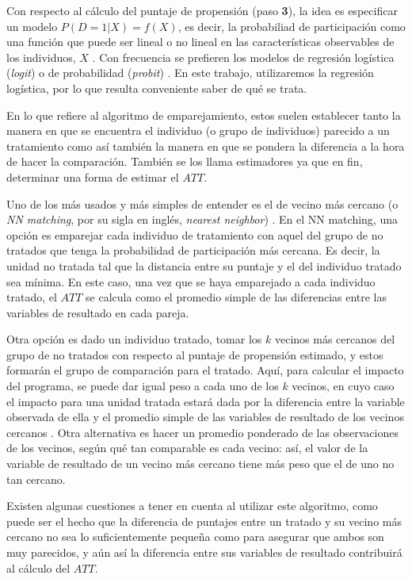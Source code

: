 \documentclass[../../main.tex]{subfiles}
\begin{document}
Con respecto al cálculo del puntaje de propensión (paso \textbf{3}), la idea es
especificar un modelo \(P(D=1|X) = f(X)\), es decir, la probabiliad de participación como
una función que puede ser lineal o no lineal en las características observables de los
individuos, \(X\) \cite{bernal}. Con frecuencia se prefieren los modelos de regresión
logística (\textit{logit}) o de probabilidad (\textit{probit}) \cite{bernal}. En este
trabajo, utilizaremos la regresión logística, por lo que resulta conveniente saber de qué
se trata.

En lo que refiere al algoritmo de emparejamiento, estos suelen establecer tanto la manera
en que se encuentra el individuo (o grupo de individuos) parecido a un tratamiento como
así también la manera en que se pondera la diferencia a la hora de hacer la comparación.
También se los llama estimadores ya que en fin, determinar una forma de estimar el
\(ATT\).

Uno de los más usados y más simples de entender es el de vecino más cercano (o \textit{NN
matching}, por su sigla en inglés, \textit{nearest neighbor}) \cite{bernal}. En el NN
matching, una opción es emparejar cada individuo de tratamiento con aquel del grupo de no
tratados que tenga la probabilidad de participación más cercana. Es decir, la unidad no
tratada tal que la distancia entre su puntaje y el del individuo tratado sea mínima. En
este caso, una vez que se haya emparejado a cada individuo tratado, el \(ATT\) se calcula
como el promedio simple de las diferencias entre las variables de resultado en cada pareja.

Otra opción es dado un individuo tratado, tomar los \(k\) vecinos más cercanos del grupo
de no tratados con respecto al puntaje de propensión estimado, y estos formarán el grupo
de comparación para el tratado. Aquí, para calcular el impacto del programa, se puede dar
igual peso a cada uno de los \(k\) vecinos, en cuyo caso el impacto para una unidad
tratada estará dada por la diferencia entre la variable observada de ella y el promedio
simple de las variables de resultado de los vecinos cercanos \cite{bernal}. Otra
alternativa es hacer un promedio ponderado de las observaciones de los vecinos, según qué
tan comparable es cada vecino: así, el valor de la variable de resultado de un vecino más
cercano tiene más peso que el de uno no tan cercano.

Existen algunas cuestiones a tener en cuenta al utilizar este algoritmo, como puede ser
el hecho que la diferencia de puntajes entre un tratado y su vecino más cercano no
sea lo suficientemente pequeña como para asegurar que ambos son muy parecidos, y aún
así la diferencia entre sus variables de resultado contribuirá al cálculo del \(ATT\).
\end{document}
